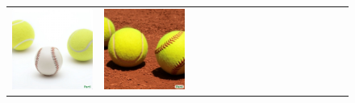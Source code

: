 \begin{figure}
\begin{adjustwidth}{-0.8in}{-0.5in}  
    \centering                     
    \footnotesize
\setlength\tabcolsep{2pt}
\vspace{-0.5in}
\begin{tabular}{cccccccccccccccccccc}

\multicolumn{3}{c}{\includegraphics[width=\twobytwocolwidth\textwidth]{figures/limitations/2tennis1baseball.jpg}} &
\multicolumn{3}{c}{\includegraphics[width=\twobytwocolwidth\textwidth]{figures/limitations/2tennis1mergedball.jpg}} &&

\end{tabular}
\end{adjustwidth}
\end{figure}
